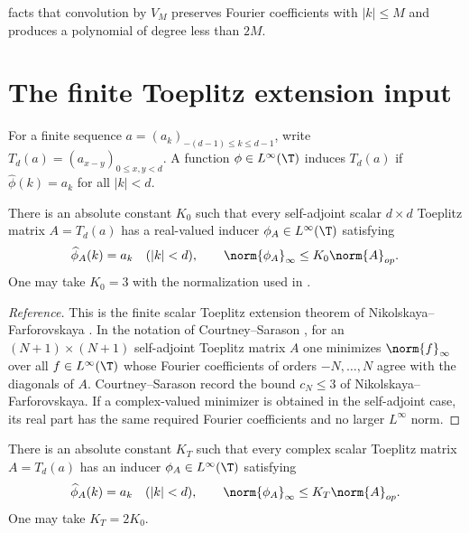 facts that convolution by $V_M$ preserves Fourier coefficients with $|k|\le M$
and produces a polynomial of degree less than $2M$.

\section{The finite Toeplitz extension input}\label{sec:extension}

For a finite sequence $a=(a_k)_{-(d-1)\le k\le d-1}$, write
$T_d(a)=(a_{x-y})_{0\le x,y<d}$.  A function $\phi\in L^\infty(\T)$ induces
$T_d(a)$ if $\widehat\phi(k)=a_k$ for all $|k|<d$.

\begin{theorem}\label{thm:selfadjoint-extension}
There is an absolute constant $K_0$ such that every self-adjoint scalar
$d\times d$ Toeplitz matrix $A=T_d(a)$ has a real-valued inducer
$\phi_A\in L^\infty(\T)$ satisfying
\[
   \widehat\phi_A(k)=a_k\quad(|k|<d),
   \qquad
   \norm{\phi_A}_\infty\le K_0\norm{A}_{op} .
\]
One may take $K_0=3$ with the normalization used in
\cite{CourtneySarason2012}.
\end{theorem}

\begin{proof}[Reference]
This is the finite scalar Toeplitz extension theorem of
Nikolskaya--Farforovskaya \cite{NikolskayaFarforovskaya2004}.  In the notation
of Courtney--Sarason \cite{CourtneySarason2012}, for an $(N+1)\times(N+1)$
self-adjoint Toeplitz matrix $A$ one minimizes $\norm{f}_\infty$ over all
$f\in L^\infty(\T)$ whose Fourier coefficients of orders $-N,\ldots,N$ agree
with the diagonals of $A$.  Courtney--Sarason record the bound $c_N\le3$ of
Nikolskaya--Farforovskaya.  If a complex-valued minimizer is obtained in the
self-adjoint case, its real part has the same required Fourier coefficients and
no larger $L^\infty$ norm.
\end{proof}

\begin{corollary}\label{cor:complex-extension}
There is an absolute constant $K_T$ such that every complex scalar Toeplitz
matrix $A=T_d(a)$ has an inducer $\phi_A\in L^\infty(\T)$ satisfying
\[
   \widehat\phi_A(k)=a_k\quad(|k|<d),
   \qquad
   \norm{\phi_A}_\infty\le K_T\norm{A}_{op} .
\]
One may take $K_T=2K_0$.
\end{corollary}

